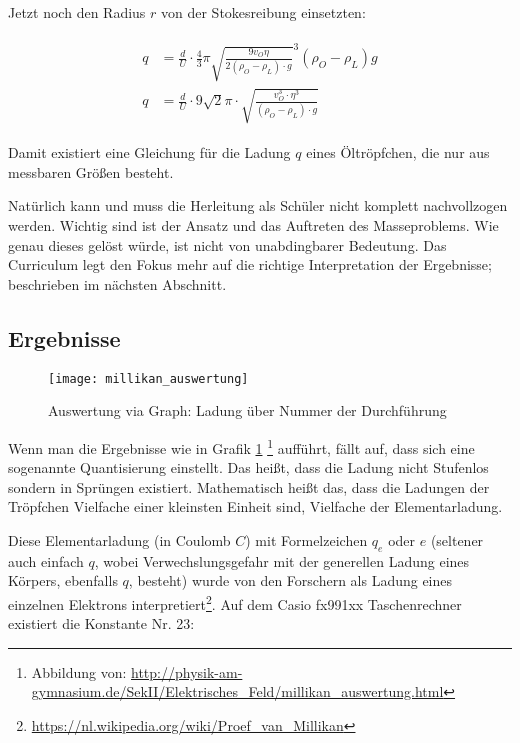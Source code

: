 \noindent Jetzt noch den Radius $r$ von der Stokesreibung einsetzten:

\begin{align}
\begin{split}
	q &= \frac{d}{U} \cdot \frac{4}{3} \pi \sqrt{\frac{9v_{O}\eta}{2(\rho_{O}-\rho_{L}) \cdot g}}^3 (\rho_{O} - \rho_{L}) g \\
	q &= \frac{d}{U} \cdot 9\sqrt{2} \pi \cdot \sqrt{\frac{v_{O}^3 \cdot \eta^3}{(\rho_O - \rho_L) \cdot g}}
\end{split}
\end{align}

Damit existiert eine Gleichung für die Ladung $q$ eines Öltröpfchen, die nur aus messbaren Größen besteht.

\begin{Anmerkung}
Natürlich kann und muss die Herleitung als Schüler nicht komplett nachvollzogen werden. Wichtig sind ist der Ansatz und das Auftreten des Masseproblems. Wie genau dieses gelöst würde, ist nicht von unabdingbarer Bedeutung. Das Curriculum legt den Fokus mehr auf die richtige Interpretation der Ergebnisse; beschrieben im nächsten Abschnitt.
\end{Anmerkung}


\subsection{Ergebnisse}

\begin{figure}[h!]
	\center
	\texttt{[image: millikan\_auswertung]}
	\caption{Auswertung via Graph: Ladung über Nummer der Durchführung}
	\vspace*{-10pt}
	\label{fig:millikan_auswertung}
\end{figure}

Wenn man die Ergebnisse wie in Grafik \ref{fig:millikan_auswertung} \footnote{Abbildung von: \url{http://physik-am-gymnasium.de/SekII/Elektrisches_Feld/millikan_auswertung.html}} aufführt, fällt auf, dass sich eine sogenannte Quantisierung einstellt. Das heißt, dass die Ladung nicht \glqq Stufenlos\grqq{} sondern in \glqq Sprüngen\grqq{} existiert. Mathematisch heißt das, dass die Ladungen der Tröpfchen Vielfache einer kleinsten Einheit sind, Vielfache der \glqq Elementarladung\grqq .

Diese Elementarladung (in Coulomb $C$) mit Formelzeichen $q_e$ oder $e$ (seltener auch einfach $q$, wobei Verwechslungsgefahr mit der generellen Ladung eines Körpers, ebenfalls $q$, besteht) wurde von den Forschern als Ladung eines einzelnen Elektrons interpretiert\footnote{\url{https://nl.wikipedia.org/wiki/Proef_van_Millikan}}. Auf dem Casio fx991xx Taschenrechner existiert die Konstante Nr. 23:

